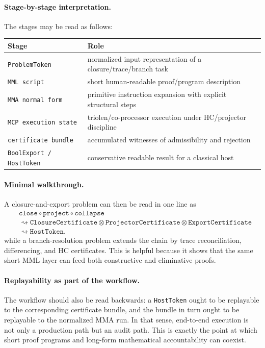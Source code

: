 \paragraph{Stage-by-stage interpretation.}
The stages may be read as follows:
\begin{center}
\small\begin{tabular}{@{}p{}p{}@{}}
\toprule
Stage & Role \\
\midrule
\texttt{ProblemToken} & normalized input representation of a closure/trace/branch task \\
\texttt{MML script} & short human-readable proof/program description \\
\texttt{MMA normal form} & primitive instruction expansion with explicit structural steps \\
\texttt{MCP execution state} & triolen/co-processor execution under HC/projector discipline \\
\texttt{certificate bundle} & accumulated witnesses of admissibility and rejection \\
\texttt{BoolExport / HostToken} & conservative readable result for a classical host \\
\bottomrule
\end{tabular}
\end{center}

\paragraph{Minimal walkthrough.}
A closure-and-export problem can then be read in one line as
\[
\begin{aligned}
&\texttt{close} \circ \texttt{project} \circ \texttt{collapse}\\
&\rightsquigarrow \texttt{ClosureCertificate} \otimes \texttt{ProjectorCertificate} \otimes \texttt{ExportCertificate}\\
&\rightsquigarrow \texttt{HostToken}.
\end{aligned}
\]
while a branch-resolution problem extends the chain by trace reconciliation, differencing, and HC certificates. This is helpful because it shows that the same short MML layer can feed both constructive and eliminative proofs.

\paragraph{Replayability as part of the workflow.}
The workflow should also be read backwards: a \texttt{HostToken} ought to be replayable to the corresponding certificate bundle, and the bundle in turn ought to be replayable to the normalized MMA run. In that sense, end-to-end execution is not only a production path but an audit path. This is exactly the point at which short proof programs and long-form mathematical accountability can coexist.

